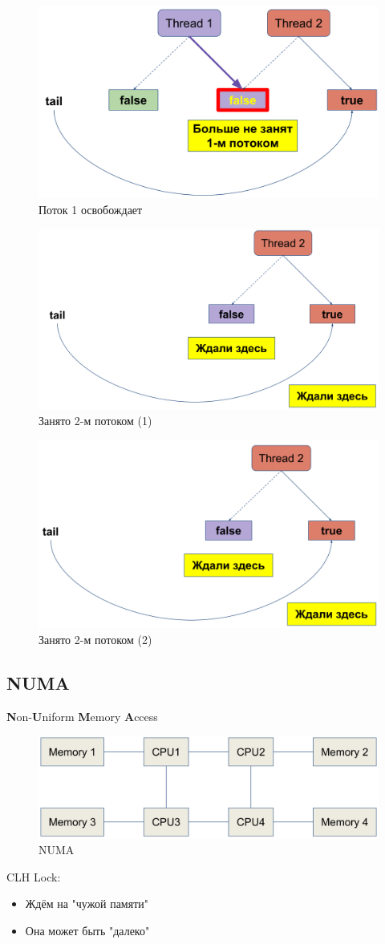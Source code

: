 \documentclass[10pt,a4paper,oneside,titlepage]{article}
\theoremstyle{plain}
\theoremstyle{defenition}
\begin{document}
\begin{figure}[h!]
	\centering
	\includegraphics[width=0.4\linewidth]{pictures/CLH13}
	\caption{Поток 1 освобождает}
	\label{fig:clh13}
\end{figure}

\begin{figure}[h!]
	\centering
	\includegraphics[width=0.4\linewidth]{pictures/CLH14}
	\caption{Занято 2-м потоком (1)}
	\label{fig:clh14}
\end{figure}

\begin{figure}[h!]
	\centering
	\includegraphics[width=0.4\linewidth]{pictures/CLH15}
	\caption{Занято 2-м потоком (2)}
	\label{fig:clh15}
\end{figure}

\subsection{NUMA}
{\bfseries N}on-{\bfseries U}niform {\bfseries M}emory {\bfseries A}ccess

\begin{figure}[h!]
	\centering
	\includegraphics[width=0.4\linewidth]{pictures/CLH16}
	\caption{NUMA}
	\label{fig:clh16}
\end{figure}

CLH Lock:
\begin{itemize}
	\item Ждём на "чужой памяти"
	\item Она может быть "далеко"
\end{itemize}
\end{document}
